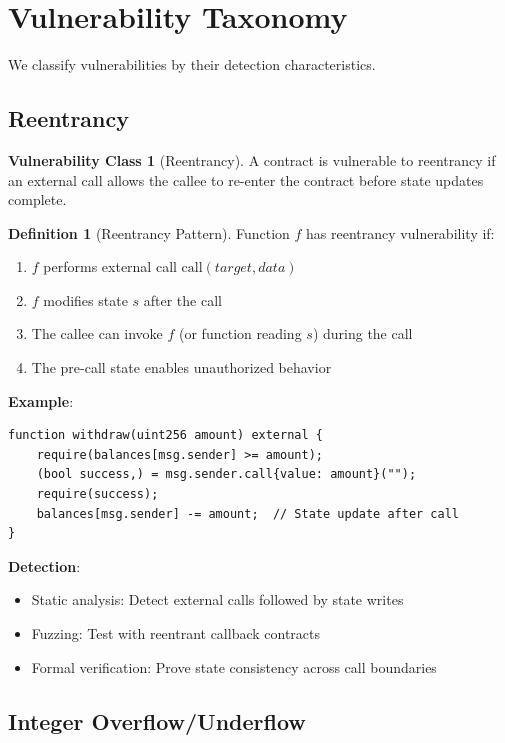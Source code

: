 \documentclass[11pt,a4paper]{article}
\theoremstyle{definition}
\newtheorem{definition}{Definition}
\newtheorem{vulnerability}{Vulnerability Class}
\begin{document}
\section{Vulnerability Taxonomy}

We classify vulnerabilities by their detection characteristics.

\subsection{Reentrancy}

\begin{vulnerability}[Reentrancy]
A contract is vulnerable to reentrancy if an external call allows the callee to re-enter the contract before state updates complete.
\end{vulnerability}

\begin{definition}[Reentrancy Pattern]
Function $f$ has reentrancy vulnerability if:
\begin{enumerate}
    \item $f$ performs external call $\text{call}(target, data)$
    \item $f$ modifies state $s$ after the call
    \item The callee can invoke $f$ (or function reading $s$) during the call
    \item The pre-call state enables unauthorized behavior
\end{enumerate}
\end{definition}

\textbf{Example}:
\begin{lstlisting}
function withdraw(uint256 amount) external {
    require(balances[msg.sender] >= amount);
    (bool success,) = msg.sender.call{value: amount}("");
    require(success);
    balances[msg.sender] -= amount;  // State update after call
}
\end{lstlisting}

\textbf{Detection}:
\begin{itemize}
    \item Static analysis: Detect external calls followed by state writes
    \item Fuzzing: Test with reentrant callback contracts
    \item Formal verification: Prove state consistency across call boundaries
\end{itemize}

\subsection{Integer Overflow/Underflow}
\end{document}
